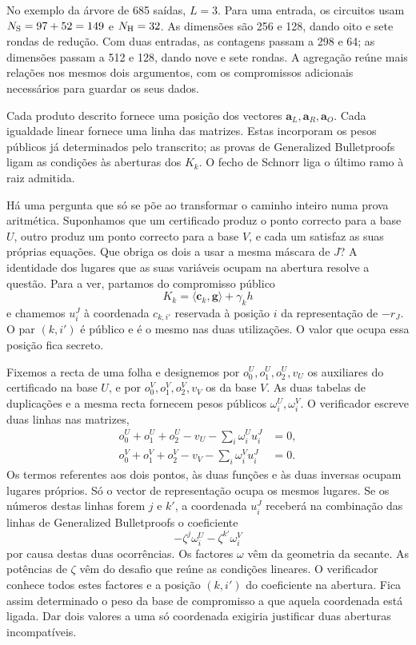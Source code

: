 No exemplo da árvore de 685 saídas, \(L=3\). Para uma
entrada, os circuitos usam
\(N_{\rm S}=97+52=149\) e \(N_{\rm H}=32\).
As dimensões são 256 e 128, dando oito e sete rondas de
redução. Com duas entradas, as contagens passam a 298 e
64; as dimensões passam a 512 e 128, dando nove e sete
rondas. A agregação reúne mais relações nos mesmos dois
argumentos, com os compromissos adicionais necessários
para guardar os seus dados.

Cada produto descrito fornece uma posição dos vectores
\(\boldsymbol a_L,\boldsymbol a_R,\boldsymbol a_O\).
Cada igualdade linear fornece uma linha das matrizes. Estas incorporam os
pesos públicos já determinados pelo transcrito; as provas
de Generalized Bulletproofs ligam as condições às aberturas
dos \(K_k\). O fecho de Schnorr liga o último ramo à raiz
admitida.

Há uma pergunta que só se põe ao transformar o caminho inteiro
numa prova aritmética. Suponhamos que um certificado produz o
ponto correcto para a base \(U\), outro produz um ponto correcto
para a base \(V\), e cada um satisfaz as suas próprias equações.
Que obriga os dois a usar a mesma máscara de \(J\)? A identidade
dos lugares que as suas variáveis ocupam na abertura resolve a
questão. Para a ver, partamos do compromisso público
\[
 K_k=\langle\boldsymbol c_k,\boldsymbol g\rangle+\gamma_kh
\]
e chamemos \(u_i^J\) à coordenada \(c_{k,i'}\) reservada à
posição \(i\) da representação de \(-r_J\). O par \((k,i')\)
é público e é o mesmo nas duas utilizações. O valor que ocupa
essa posição fica secreto.

Fixemos a recta de uma folha e designemos por
\(o^U_0,o^U_1,o^U_2,v_U\) os auxiliares do certificado na base
\(U\), e por \(o^V_0,o^V_1,o^V_2,v_V\) os da base \(V\).
As duas tabelas de duplicações e a mesma recta fornecem pesos
públicos \(\omega^U_i,\omega^V_i\). O verificador escreve duas
linhas nas matrizes,
\[
 \begin{aligned}
  o^U_0+o^U_1+o^U_2-v_U-\sum_i\omega_i^U u_i^J&=0,\\
  o^V_0+o^V_1+o^V_2-v_V-\sum_i\omega_i^V u_i^J&=0 .
 \end{aligned}
\]
Os termos referentes aos dois pontos, às duas funções e às duas
inversas ocupam lugares próprios. Só o vector de representação
ocupa os mesmos lugares. Se os números destas linhas forem
\(j\) e \(k'\), a coordenada \(u_i^J\) receberá na combinação
das linhas de Generalized Bulletproofs o coeficiente
\[
       -\zeta^j\omega_i^U-\zeta^{k'}\omega_i^V
\]
por causa destas duas ocorrências. Os factores \(\omega\) vêm da
geometria da secante. As potências de \(\zeta\) vêm do desafio
que reúne as condições lineares. O verificador conhece todos
estes factores e a posição \((k,i')\) do coeficiente na abertura.
Fica assim determinado o peso da base de compromisso a que aquela
coordenada está ligada. Dar dois valores a uma só coordenada
exigiria justificar duas aberturas incompatíveis.


